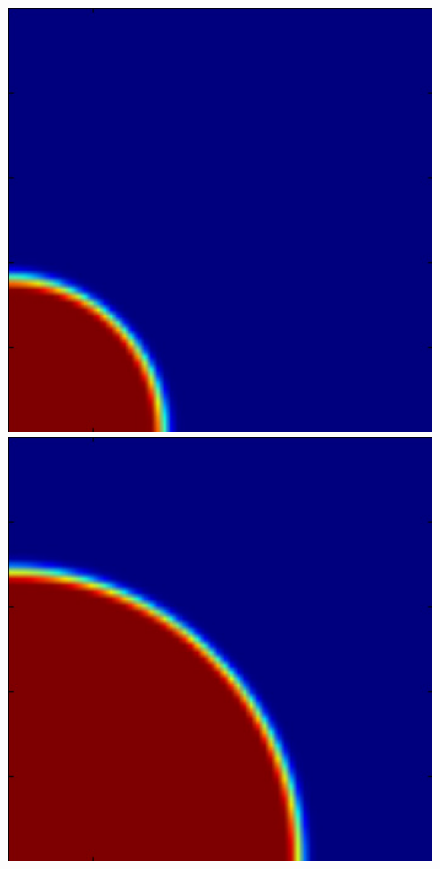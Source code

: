 \begin{figure}[t]
{  %
  \includegraphics[scale=0.3]{i1-HIIcontour_10myr_nx64.pdf}
  \hspace{0.1cm}
  \includegraphics[scale=0.3]{i1-HIIcontour_100myr_nx64.pdf}
}
\end{figure}
